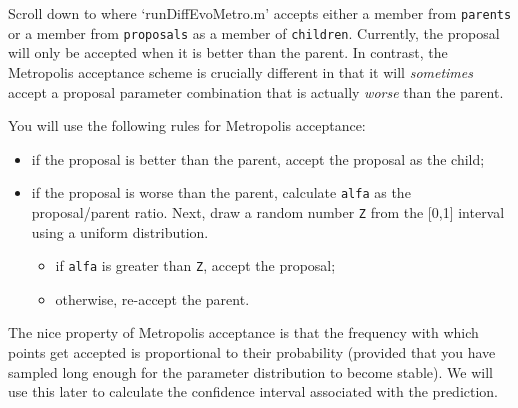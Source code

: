 
Scroll down to where `runDiffEvoMetro.m' accepts either a member from
\texttt{parents} or a member from \texttt{proposals} as a member of
\texttt{children}. Currently, the proposal will only be accepted when it is
better than the parent. In contrast, the Metropolis acceptance scheme is
crucially different in that it will \textit{sometimes} accept a proposal parameter
combination that is actually \textit{worse} than the parent. 

You will use the following rules for Metropolis acceptance:
\begin{itemize}
    \item{if the proposal is better than the parent, accept the proposal as the
    child;}
    \item{if the proposal is worse than the parent, calculate \texttt{alfa} as the
    proposal/parent ratio. Next, draw a random number \texttt{Z}
    from the [0,1] interval using a uniform distribution.}
    \begin{itemize}
        \item{if \texttt{alfa} is greater than \texttt{Z}, accept the proposal;}
        \item{otherwise, re-accept the parent.}
    \end{itemize}
\end{itemize}

The nice property of Metropolis acceptance is that the frequency with
which points get accepted is proportional to their probability (provided that
you have sampled long enough for the parameter distribution to become stable).
We will use this later to calculate the confidence interval associated with the
prediction.



